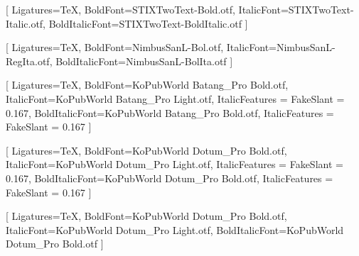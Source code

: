 \usepackage{diagbox}                        %
\usepackage[utf8]{inputenc}
\usepackage{setspace}
\usepackage{tocloft}
\usepackage{makeidx}                        %
\usepackage{parskip}
\usepackage[hangul]{xetexko}
\usepackage{listings}                       %
\usepackage[framemethod=tikz]{mdframed}
\usepackage[unicode]{hyperref}
\usepackage{multirow}
\usepackage[many]{tcolorbox}                
\usepackage{makecell}
\usepackage{environ}
\usepackage[tikz]{bclogo}
\usepackage{tikz}
\usepackage{lastpage}
\usepackage{fontawesome5}

\setmainfont[ExternalLocation=_extensions/bitPublish/fonts/STIXTwoText/]{STIXTwoText-Regular.otf}[%
  Ligatures=TeX,
  BoldFont=STIXTwoText-Bold.otf,
  ItalicFont=STIXTwoText-Italic.otf,
  BoldItalicFont=STIXTwoText-BoldItalic.otf
]

\setsansfont[ExternalLocation=_extensions/bitPublish/fonts/Nimbus Sans L/]{NimbusSanL-Reg.otf}[%
  Ligatures=TeX,
  BoldFont=NimbusSanL-Bol.otf,
  ItalicFont=NimbusSanL-RegIta.otf,
  BoldItalicFont=NimbusSanL-BolIta.otf
]

[%
  Ligatures=TeX,
  BoldFont=KoPubWorld Batang_Pro Bold.otf,
  ItalicFont=KoPubWorld Batang_Pro Light.otf,
  ItalicFeatures = {FakeSlant = 0.167},  
  BoldItalicFont=KoPubWorld Batang_Pro Bold.otf,
  ItalicFeatures = {FakeSlant = 0.167}  
]

[%
  Ligatures=TeX,
  BoldFont=KoPubWorld Dotum_Pro Bold.otf,
  ItalicFont=KoPubWorld Dotum_Pro Light.otf,
  ItalicFeatures = {FakeSlant = 0.167},  
  BoldItalicFont=KoPubWorld Dotum_Pro Bold.otf,
  ItalicFeatures = {FakeSlant = 0.167}  
]

[%
  Ligatures=TeX,
  BoldFont=KoPubWorld Dotum_Pro Bold.otf,
  ItalicFont=KoPubWorld Dotum_Pro Light.otf,
  BoldItalicFont=KoPubWorld Dotum_Pro Bold.otf
]

